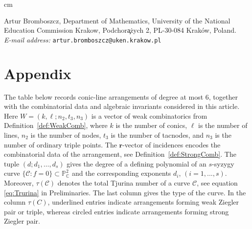 \documentclass[11pt]{article}
\theoremstyle{plain}
\theoremstyle{definition}
\let\oldeqref\eqref
\renewcommand{\eqref}[1]{\begingroup\hypersetup{linkcolor=black}\oldeqref{#1}\endgroup}
\begin{document}
 cm

\bigskip
Artur Bromboszcz,
Department of Mathematics,
University of the National Education Commission Krakow,
Podchor\c a\.zych 2,
PL-30-084 Krak\'ow, Poland. \\
\nopagebreak
\textit{E-mail address:} \texttt{artur.bromboszcz@uken.krakow.pl}


\section*{Appendix}
\label{sec:data}

The table below records conic-line arrangements of degree at most \(6\),
together with the combinatorial data and algebraic invariants considered in this article. Here \(W=(k,\ell;n_2,t_3,n_3)\) is a vector of weak combinatorics from Definition~\ref{def:WeakComb}, where \(k\) is the number of conics, \(\ell\) is the number of lines, \(n_2\) is the number of nodes, \(t_3\) is the number of tacnodes, and \(n_3\) is the number of ordinary triple points. The \(\mathbf r\)-vector of incidences encodes the combinatorial data of the arrangement, see Definition~\ref{def:StrongComb}.
The tuple \((d;d_1,\ldots,d_s)\) gives the degree of a defining polynomial of an \(s\)-syzygy curve \(\{\mathcal{C}:{f=0}\}\subset\mathbb P^2_{\mathbb C}\) and the corresponding exponents \(d_i\),  \((i=1,...,s)\).
Moreover, \(\tau(\mathcal C)\) denotes the total Tjurina number of a curve $\mathcal{C}$, see equation \eqref{eq:Trurina} in Preliminaries. The last column gives the type of the curve.
In the column \(\tau(C)\), underlined entries indicate arrangements forming weak Ziegler pair or triple, whereas circled entries indicate arrangements forming strong Ziegler pair.
\end{document}
